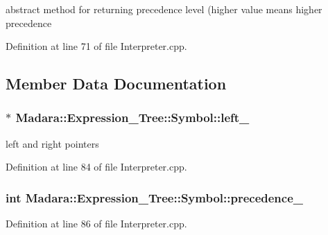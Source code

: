 abstract method for returning precedence level (higher value means higher precedence 



Definition at line 71 of file Interpreter.cpp.



\subsection{Member Data Documentation}
\hypertarget{classMadara_1_1Expression__Tree_1_1Symbol_a7808eb3daad675e2e01409f173a41cee}{
\subsubsection[{left\_\-}]{$\ast$ {\bf Madara::Expression\_\-Tree::Symbol::left\_\-}}}
\label{d5/d85/classMadara_1_1Expression__Tree_1_1Symbol_a7808eb3daad675e2e01409f173a41cee}


left and right pointers 



Definition at line 84 of file Interpreter.cpp.

\hypertarget{classMadara_1_1Expression__Tree_1_1Symbol_a2de31139261eea47dccd48d377780803}{
\subsubsection[{precedence\_\-}]{\setlength{\rightskip}{0pt plus 5cm}int {\bf Madara::Expression\_\-Tree::Symbol::precedence\_\-}}}
\label{d5/d85/classMadara_1_1Expression__Tree_1_1Symbol_a2de31139261eea47dccd48d377780803}


Definition at line 86 of file Interpreter.cpp.

